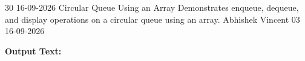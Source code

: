 \clearpage
\label{prog:30}
\programhead
  {30}
  {16-09-2026}
  {Circular Queue Using an Array}
  {Demonstrates enqueue, dequeue, and display operations on a circular queue using an array.}
  {Abhishek Vincent}
  {03}
  {16-09-2026}

\divider
\textbf{Output Text:}\par
\vspace{2pt}

